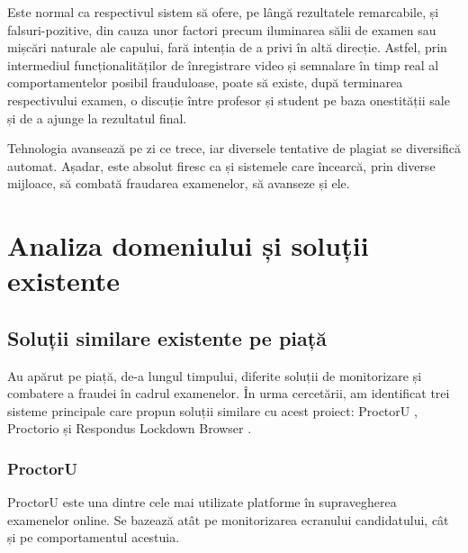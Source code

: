 \documentclass[12pt,a4paper]{article}
\begin{document}
Este normal ca respectivul sistem să ofere, pe lângă rezultatele
remarcabile, și falsuri-pozitive, din cauza unor factori precum
iluminarea sălii de examen sau mișcări naturale ale capului, fară
intenția de a privi în altă direcție. Astfel, prin intermediul
funcționalităților de înregistrare video și semnalare în timp real al
comportamentelor posibil frauduloase, poate să existe, după terminarea
respectivului examen, o discuție între profesor și student pe baza
onestității sale și de a ajunge la rezultatul final. 

Tehnologia avansează pe zi ce trece, iar diversele tentative de plagiat se diversifică automat.
Așadar, este absolut firesc ca și sistemele care încearcă, prin
diverse mijloace, să combată fraudarea examenelor, să avanseze și ele.

\section{Analiza domeniului și soluții existente}

\subsection{Soluții similare existente pe piață}

\hspace{6mm}Au apărut pe piață, de-a lungul timpului, diferite soluții de
monitorizare și combatere a fraudei în cadrul examenelor. În urma cercetării, am identificat
trei sisteme principale care propun soluții similare cu acest proiect: ProctorU \cite{proctoru}, 
Proctorio \cite{proctorio} și Respondus Lockdown Browser \cite{respondus}.

\subsubsection{ProctorU}
\hspace{6mm}ProctorU este una dintre cele mai utilizate platforme în
supravegherea examenelor online. Se bazează atât pe monitorizarea
ecranului candidatului, cât și pe comportamentul acestuia. 
\end{document}
